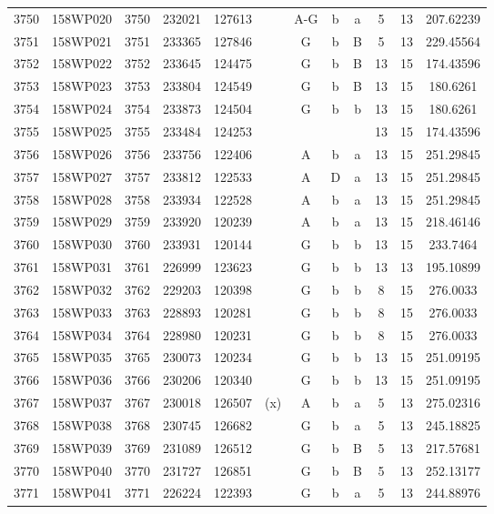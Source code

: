 \begin{tabular}{|*{12}{c|}}
3750 & 158WP020 & 3750 & 232021 & 127613 &  & A-G & b & a & 5 & 13 & 207.62239 \\ 
3751 & 158WP021 & 3751 & 233365 & 127846 &  & G & b & B & 5 & 13 & 229.45564 \\ 
3752 & 158WP022 & 3752 & 233645 & 124475 &  & G & b & B & 13 & 15 & 174.43596 \\ 
3753 & 158WP023 & 3753 & 233804 & 124549 &  & G & b & B & 13 & 15 & 180.6261 \\ 
3754 & 158WP024 & 3754 & 233873 & 124504 &  & G & b & b & 13 & 15 & 180.6261 \\ 
3755 & 158WP025 & 3755 & 233484 & 124253 &  &  &  &  & 13 & 15 & 174.43596 \\ 
3756 & 158WP026 & 3756 & 233756 & 122406 &  & A & b & a & 13 & 15 & 251.29845 \\ 
3757 & 158WP027 & 3757 & 233812 & 122533 &  & A & D & a & 13 & 15 & 251.29845 \\ 
3758 & 158WP028 & 3758 & 233934 & 122528 &  & A & b & a & 13 & 15 & 251.29845 \\ 
3759 & 158WP029 & 3759 & 233920 & 120239 &  & A & b & a & 13 & 15 & 218.46146 \\ 
3760 & 158WP030 & 3760 & 233931 & 120144 &  & G & b & b & 13 & 15 & 233.7464 \\ 
3761 & 158WP031 & 3761 & 226999 & 123623 &  & G & b & b & 13 & 13 & 195.10899 \\ 
3762 & 158WP032 & 3762 & 229203 & 120398 &  & G & b & b & 8 & 15 & 276.0033 \\ 
3763 & 158WP033 & 3763 & 228893 & 120281 &  & G & b & b & 8 & 15 & 276.0033 \\ 
3764 & 158WP034 & 3764 & 228980 & 120231 &  & G & b & b & 8 & 15 & 276.0033 \\ 
3765 & 158WP035 & 3765 & 230073 & 120234 &  & G & b & b & 13 & 15 & 251.09195 \\ 
3766 & 158WP036 & 3766 & 230206 & 120340 &  & G & b & b & 13 & 15 & 251.09195 \\ 
3767 & 158WP037 & 3767 & 230018 & 126507 & (x) & A & b & a & 5 & 13 & 275.02316 \\ 
3768 & 158WP038 & 3768 & 230745 & 126682 &  & G & b & a & 5 & 13 & 245.18825 \\ 
3769 & 158WP039 & 3769 & 231089 & 126512 &  & G & b & B & 5 & 13 & 217.57681 \\ 
3770 & 158WP040 & 3770 & 231727 & 126851 &  & G & b & B & 5 & 13 & 252.13177 \\ 
3771 & 158WP041 & 3771 & 226224 & 122393 &  & G & b & a & 5 & 13 & 244.88976 \\ 

\end{tabular}
